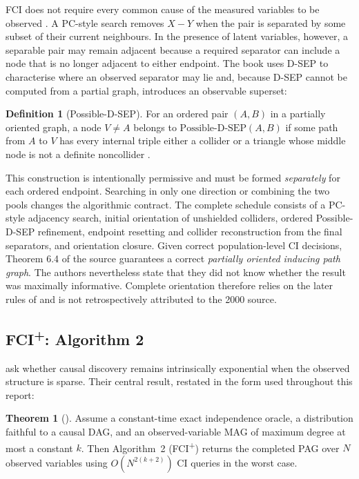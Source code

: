 \documentclass[11pt,a4paper]{article}
\theoremstyle{definition}
\newtheorem{definition}{Definition}
\newtheorem{theorem}{Theorem}
\newcommand{\FCIplus}{FCI\textsuperscript{+}}
\begin{document}
FCI does not require every common cause of the measured variables to be
observed \citep[Ch.~6]{spirtes2000causation}. A PC-style search removes
\(X - Y\) when the pair is separated by some subset of their current
neighbours. In the presence of latent variables, however, a separable pair
may remain adjacent because a required separator can include a node that is
no longer adjacent to either endpoint. The book uses D-SEP to characterise
where an observed separator may lie and, because D-SEP cannot be computed
from a partial graph, introduces an observable superset:

\begin{definition}[Possible-D-SEP]
For an ordered pair \((A,B)\) in a partially oriented graph, a node
\(V \neq A\) belongs to \(\mathrm{Possible\text{-}D\text{-}SEP}(A,B)\) if
some path from \(A\) to \(V\) has every internal triple either a collider or
a triangle whose middle node is not a definite noncollider
\citep{spirtes2000causation}.
\end{definition}

This construction is intentionally permissive and must be formed
\emph{separately} for each ordered endpoint. Searching in only one direction
or combining the two pools changes the algorithmic contract. The complete
schedule consists of a PC-style adjacency search, initial orientation of
unshielded colliders, ordered Possible-D-SEP refinement, endpoint resetting
and collider reconstruction from the final separators, and orientation
closure. Given correct population-level CI decisions, Theorem 6.4 of the
source guarantees a correct \emph{partially oriented inducing path graph}.
The authors nevertheless state that they did not know whether the result was
maximally informative. Complete orientation therefore relies on the later
rules of \citet{zhang2008completeness} and is not retrospectively attributed
to the 2000 source.

\subsection{\texorpdfstring{\FCIplus{}}{FCI+}: Algorithm 2}

\citet{claassen2013learning} ask whether causal discovery remains
intrinsically exponential when the observed structure is sparse. Their
central result, restated in the form used throughout this report:

\begin{theorem}[\citealp{claassen2013learning}]
Assume a constant-time exact independence oracle, a distribution faithful to
a causal DAG, and an observed-variable MAG of maximum degree at most a
constant \(k\). Then Algorithm~2 (\FCIplus{}) returns the completed PAG over
\(N\) observed variables using \(O(N^{2(k+2)})\) CI queries in the worst
case.
\end{theorem}
\end{document}

